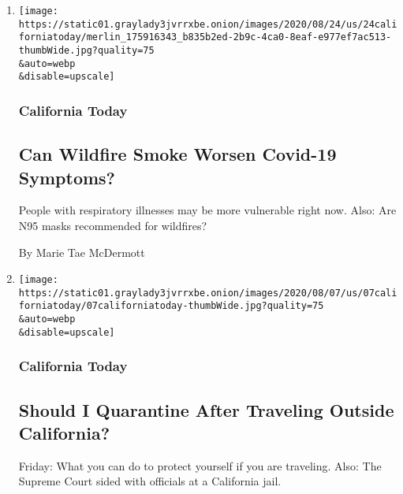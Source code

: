 \begin{enumerate}
\def\labelenumi{\arabic{enumi}.}
\item
  \href{/2020/08/21/us/wildfire-smoke-covid-n95-masks.html}{}

  \texttt{[image: https://static01.graylady3jvrrxbe.onion/images/2020/08/24/us/24californiatoday/merlin\_175916343\_b835b2ed-2b9c-4ca0-8eaf-e977ef7ac513-thumbWide.jpg?quality=75\\\&auto=webp\\\&disable=upscale]}

  \hypertarget{california-today}{%
  \subsubsection{California Today}\label{california-today}}

  \hypertarget{can-wildfire-smoke-worsen-covid-19-symptoms}{%
  \subsection{Can Wildfire Smoke Worsen Covid-19
  Symptoms?}\label{can-wildfire-smoke-worsen-covid-19-symptoms}}

  People with respiratory illnesses may be more vulnerable right now.
  Also: Are N95 masks recommended for wildfires?

  By Marie Tae McDermott
\item
  \href{/2020/08/07/us/california-travel-restrictions-covid-19.html}{}

  \texttt{[image: https://static01.graylady3jvrrxbe.onion/images/2020/08/07/us/07californiatoday/07californiatoday-thumbWide.jpg?quality=75\\\&auto=webp\\\&disable=upscale]}

  \hypertarget{california-today-1}{%
  \subsubsection{California Today}\label{california-today-1}}

  \hypertarget{should-i-quarantine-after-traveling-outside-california}{%
  \subsection{Should I Quarantine After Traveling Outside
  California?}\label{should-i-quarantine-after-traveling-outside-california}}

  Friday: What you can do to protect yourself if you are traveling.
  Also: The Supreme Court sided with officials at a California jail.


\end{enumerate}
